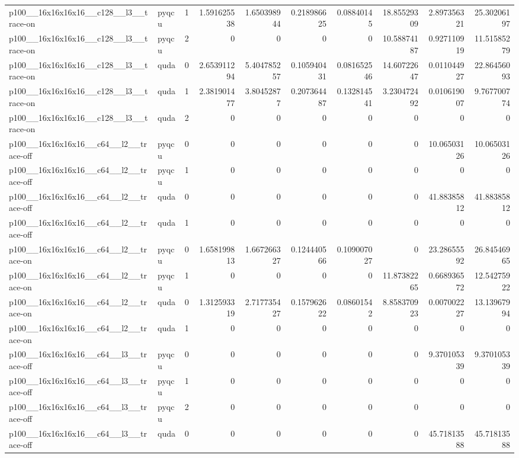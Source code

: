 \begin{table}[htbp]
\begin{tabular}{@{}llrrrrrrrr@{}}
p100\_\_16x16x16x16\_\_c128\_\_l3\_\_trace-on & pyqcu & 1 & 1.591625538 & 1.650398944 & 0.218986625 & 0.08840145 & 18.85529309 & 2.897356321 & 25.30206197 \\
p100\_\_16x16x16x16\_\_c128\_\_l3\_\_trace-on & pyqcu & 2 & 0 & 0 & 0 & 0 & 10.58874187 & 0.927110919 & 11.51585279 \\
p100\_\_16x16x16x16\_\_c128\_\_l3\_\_trace-on & quda & 0 & 2.653911294 & 5.404785257 & 0.105940431 & 0.081652546 & 14.60722647 & 0.011044927 & 22.86456093 \\
p100\_\_16x16x16x16\_\_c128\_\_l3\_\_trace-on & quda & 1 & 2.381901477 & 3.80452877 & 0.207364487 & 0.132814541 & 3.230472492 & 0.010619007 & 9.767700774 \\
p100\_\_16x16x16x16\_\_c128\_\_l3\_\_trace-on & quda & 2 & 0 & 0 & 0 & 0 & 0 & 0 & 0 \\
p100\_\_16x16x16x16\_\_c64\_\_l2\_\_trace-off & pyqcu & 0 & 0 & 0 & 0 & 0 & 0 & 10.06503126 & 10.06503126 \\
p100\_\_16x16x16x16\_\_c64\_\_l2\_\_trace-off & pyqcu & 1 & 0 & 0 & 0 & 0 & 0 & 0 & 0 \\
p100\_\_16x16x16x16\_\_c64\_\_l2\_\_trace-off & quda & 0 & 0 & 0 & 0 & 0 & 0 & 41.88385812 & 41.88385812 \\
p100\_\_16x16x16x16\_\_c64\_\_l2\_\_trace-off & quda & 1 & 0 & 0 & 0 & 0 & 0 & 0 & 0 \\
p100\_\_16x16x16x16\_\_c64\_\_l2\_\_trace-on & pyqcu & 0 & 1.658199813 & 1.667266327 & 0.124440566 & 0.109007027 & 0 & 23.28655592 & 26.84546965 \\
p100\_\_16x16x16x16\_\_c64\_\_l2\_\_trace-on & pyqcu & 1 & 0 & 0 & 0 & 0 & 11.87382265 & 0.668936572 & 12.54275922 \\
p100\_\_16x16x16x16\_\_c64\_\_l2\_\_trace-on & quda & 0 & 1.312593319 & 2.717735427 & 0.157962622 & 0.08601542 & 8.858370923 & 0.007002227 & 13.13967994 \\
p100\_\_16x16x16x16\_\_c64\_\_l2\_\_trace-on & quda & 1 & 0 & 0 & 0 & 0 & 0 & 0 & 0 \\
p100\_\_16x16x16x16\_\_c64\_\_l3\_\_trace-off & pyqcu & 0 & 0 & 0 & 0 & 0 & 0 & 9.370105339 & 9.370105339 \\
p100\_\_16x16x16x16\_\_c64\_\_l3\_\_trace-off & pyqcu & 1 & 0 & 0 & 0 & 0 & 0 & 0 & 0 \\
p100\_\_16x16x16x16\_\_c64\_\_l3\_\_trace-off & pyqcu & 2 & 0 & 0 & 0 & 0 & 0 & 0 & 0 \\
p100\_\_16x16x16x16\_\_c64\_\_l3\_\_trace-off & quda & 0 & 0 & 0 & 0 & 0 & 0 & 45.71813588 & 45.71813588 \\

\end{tabular}
\end{table}
